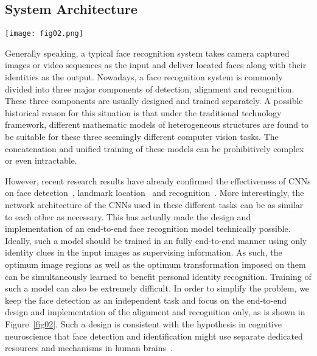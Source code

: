 \documentclass[10pt,twocolumn,letterpaper]{article}
\begin{document}
\subsection{System Architecture}
		
\begin{figure*}[htbp]
\begin{center}
\texttt{[image: fig02.png]}
\end{center}
\caption{The overall architecture  of the proposed face recognition system.}
\label{fig02}
\end{figure*}
	
Generally speaking, a typical face recognition system takes camera captured images or video sequences as the input and deliver located faces along with their identities as the output.
Nowadays, a face recognition system is commonly divided into three major components of detection, alignment and recognition.
These three components are usually designed and trained separately. 
A possible historical reason for this situation is that under the traditional technology framework, different mathematic models of heterogeneous structures are found to be suitable for these three seemingly different computer vision tasks. 
The concatenation and unified training of these models can be prohibitively complex or even intractable.

However, recent research results have already confirmed the effectiveness of CNNs on face detection~\cite{zhang2016joint}, landmark location~\cite{Zhou2013Extensive} and recognition~\cite{sun2014deep,taigman2014deepface}.
More interestingly, the network architecture of the CNNs used in these different tasks can be as  similar to each other as necessary.
This has actually made the design and implementation of an end-to-end face recognition model technically possible.
Ideally, such a model should be trained in an fully end-to-end manner using only identity clues in the input images as supervising information.
As such, the optimum image regions as well as the optimum transformation imposed on them can be simultaneously learned to benefit personal identity recognition. 
Training of such a model can also be extremely difficult.
In order to simplify the problem, we keep the face detection as an independent task and focus on the end-to-end design and implementation of the alignment and recognition only, as is shown in Figure~\ref{fig02}. 
Such a design is consistent with the hypothesis in cognitive neuroscience that face detection and identification might use separate dedicated resources and mechanisms in human brains~\cite{Tsao2008Mechanisms}.
\end{document}
